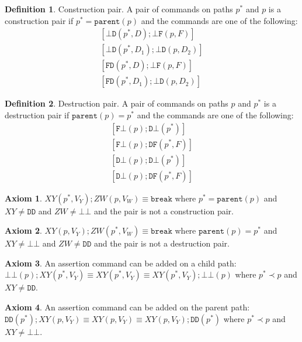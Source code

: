 \documentclass[12pt]{article}
\newcommand{\empt}{\bot}
\newcommand{\parent}{\mathtt{parent}}
\newcommand{\pp}{p^*} %
\newcommand{\cbrk}{\mathtt{break}}
\newcommand{\fscommand}[2]{{#1#2}}
\newcommand{\fsregcommandchar}[1]{\mathtt{#1}}
\newcommand{\fsregcommand}[2]{\fscommand{\fsregcommandchar{#1}}{\fsregcommandchar{#2}}}
\newcommand{\cbb}{\fsregcommand{\empt}{\empt}}
\newcommand{\cbf}{\fsregcommand{\empt}{F}}
\newcommand{\cbd}{\fsregcommand{\empt}{D}}
\newcommand{\cfb}{\fsregcommand{F}{\empt}}
\newcommand{\cfd}{\fsregcommand{F}{D}}
\newcommand{\cdb}{\fsregcommand{D}{\empt}}
\newcommand{\cdf}{\fsregcommand{D}{F}}
\newcommand{\cdd}{\fsregcommand{D}{D}}
\newcommand{\cxy}{\fscommand{X}{Y}}
\newcommand{\czw}{\fscommand{Z}{W}}
\newcommand{\descendant}{\prec}
\theoremstyle{definition}
\newtheorem{mydef}{Definition}
\newtheorem{myax}{Axiom}
\begin{document}
\begin{mydef}{Construction pair.}
A pair of commands on paths $\pp$ and $p$ is a construction pair if $\pp=\parent(p)$ and the commands are one
of the following:
   \begin{gather*}
            [\cbd(\pp, D); \cbf(p, F)] \\
            [\cbd(\pp, D_1); \cbd(p, D_2)] \\
            [\cfd(\pp, D); \cbf(p, F)] \\
            [\cfd(\pp, D_1); \cbd(p, D_2)]
   \end{gather*}
\end{mydef}

\begin{mydef}{Destruction pair.}
A pair of commands on paths $p$ and $\pp$ is a destruction pair if $\parent(p)=\pp$ and the commands are one
of the following:
   \begin{gather*}
            [\cfb(p); \cdb(\pp)] \\
            [\cfb(p); \cdf(\pp, F)] \\
            [\cdb(p); \cdb(\pp)] \\
            [\cdb(p); \cdf(\pp, F)]
   \end{gather*}
\end{mydef}

\begin{myax}\label{ax_directchild_breaks}
$\cxy(\pp,V_Y); \czw(p,V_W) \equiv \cbrk$ where $\pp=\parent(p)$ and $\cxy\neq\cdd$ and $\czw\neq\cbb$
and the pair is not a construction pair.
\end{myax}

\begin{myax}\label{ax_directparent_breaks}
$\cxy(p,V_Y); \czw(\pp,V_W) \equiv \cbrk$ where $\parent(p)=\pp$ and $\cxy\neq\cbb$ and $\czw\neq\cdd$
and the pair is not a destruction pair.
\end{myax}

\begin{myax}\label{ax_child_assert}
An assertion command can be added on a child path:
$\cbb(p);\cxy(\pp,V_Y) \equiv \cxy(\pp,V_Y) \equiv \cxy(\pp,V_Y);\cbb(p)$ where $\pp\descendant p$ and $\cxy\neq\cdd$.
\end{myax}

\begin{myax}\label{ax_parent_assert}
An assertion command can be added on the parent path:
$\cdd(\pp);\cxy(p,V_Y) \equiv \cxy(p,V_Y) \equiv \cxy(p,V_Y);\cdd(\pp)$ where $\pp\descendant p$ and $\cxy\neq\cbb$.
\end{myax}
\end{document}
